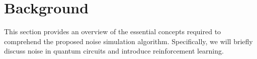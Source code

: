 \documentclass[sn-basic]{sn-jnl} %
\begin{document}


\section{Background}\label{sec_background}
This section provides an overview of the essential concepts required to comprehend the proposed noise simulation algorithm. 
Specifically, we will briefly discuss noise in quantum circuits and introduce reinforcement learning.
\end{document}
